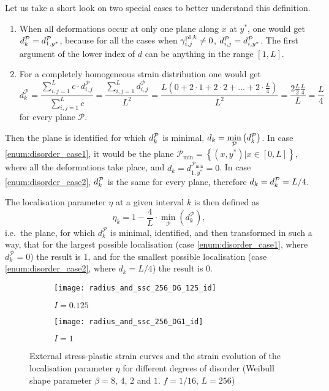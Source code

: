 Let us take a short look on two special cases to better understand this definition.
\begin{enumerate}
\item \label{enum:disorder_case1} When all deformations occur at only one plane along $x$ at $y^*$, one would get $d_k^{\cal P} = d_{1,{y^*}}^{\cal P}$, because for all the cases when $\gamma _{i,j}^{{\rm{pl,}}k} \ne 0$, $d_{i,j}^{\cal P} = d_{i,{y^*}}^{\cal P}$. The first argument of the lower index of $d$ can be anything in the range $\left[ {1,L} \right]$.
\item \label{enum:disorder_case2} For a completely homogeneous strain distribution one would get 
\[d_k^\mathcal{P} = \frac{{\sum\limits_{i,j = 1}^L {c \cdot d_{i,j}^\mathcal{P}} }}{{\sum\limits_{i,j = 1}^L c }} = \frac{{\sum\limits_{i,j = 1}^L {d_{i,j}^\mathcal{P}} }}{{{L^2}}} = \frac{{L\left( {0 + 2 \cdot 1 + 2 \cdot 2 + ... + 2 \cdot \frac{L}{4}} \right)}}{{{L^2}}} = \frac{{2\frac{L}{2}\frac{L}{4}}}{L} = \frac{L}{4}\]
for every plane $\mathcal{P}$.
\end{enumerate}

Then the plane is identified for which $d_k^{\cal P}$ is minimal, ${d_k} = \mathop {\min }\limits_{\cal P} \left( {d_k^{\cal P}} \right)$. In case \ref{enum:disorder_case1}, it would be the plane ${\mathcal{P}_{\min }} = \left\{ {\left( {x,{y^ * }} \right)|x \in \left[ {0,L} \right]} \right\}$, where all the deformations take place, and ${d_k} = d_{1,{y^ * }}^{{\mathcal{P}_{\min }}} = 0$. In case \ref{enum:disorder_case2}, ${d_k^{\cal P}}$ is the same for every plane, therefore ${d_k} = d_k^{\cal P} = L/4$.

The localisation parameter $\eta$ at a given interval $k$ is then defined as 
\begin{equation}
{\eta _k} = 1 - \frac{4}{L} \cdot \mathop {\min }\limits_\mathcal{P} \left( {d_k^\mathcal{P}} \right),
\end{equation}
i.e.\ the plane, for which $d_k^\mathcal{P}$ is minimal, identified, and then transformed in such a way, that for the largest possible localisation (case \ref{enum:disorder_case1}, where $d_k^\mathcal{P} = 0$) the result is $1$, and for the smallest possible localisation (case \ref{enum:disorder_case2}, where ${d_k} = L/4$) the result is $0$.


\begin{figure}[htbp!] 
\centering
\begin{subfigure}[b]{0.45\textwidth}
\texttt{[image: radius\_and\_ssc\_256\_DG\_125\_id]}
\caption{$I=0.125$}
\end{subfigure}
\begin{subfigure}[b]{0.45\textwidth}
\texttt{[image: radius\_and\_ssc\_256\_DG1\_id]}
\caption{$I=1$}
\end{subfigure}
\caption[Stress-strain curves and strain localisation]{External stress-plastic strain curves and the strain evolution of the localisation parameter $\eta$ for different degrees of disorder (Weibull shape parameter $\beta=8$, $4$, $2$ and $1$. $f=1/16$, $L=256$)}
\label{fig:disorder_strain_localisation}
\end{figure}


